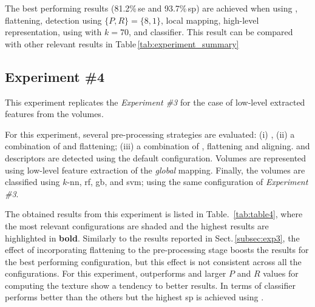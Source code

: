 The best performing results (81.2\%\,\ac{se} and 93.7\%\,\ac{sp}) are achieved when using \nlm, flattening, \lbp detection using $\{P,R\} = \{8,1\}$, local mapping, high-level representation, using \bow with $k=70$, and \svm classifier.
This result can be compared with other relevant results in Table\,\ref{tab:experiment_summary}

\subsection{Experiment \#4}\label{subsec:exp4}
%
%
%
%

This experiment replicates the \emph{Experiment \#3} for the case of low-level extracted features from the volumes.

For this experiment, several pre-processing strategies are evaluated: (i) \nlm, (ii) a combination of \nlm and flattening; (iii) a combination of \nlm, flattening and aligning.
\lbp and \lbptop descriptors are detected using the default configuration.
Volumes are represented using low-level feature extraction of the \emph{global} mapping.
Finally, the volumes are classified using $k$-\ac{nn}, \ac{rf}, \ac{gb}, and \ac{svm}; using the same configuration of \emph{Experiment \#3}.

The obtained results from this experiment is listed in Table.~\ref{tab:table4}, where the most relevant configurations are shaded and the highest results are highlighted in \textbf{bold}.
Similarly to the results reported in Sect.\,\ref{subsec:exp3}, the effect of incorporating flattening to the pre-processing stage boosts the results for the best performing configuration, but this effect is not consistent across all the configurations.
For this experiment, \lbptop outperforms \lbp and larger $P$ and $R$ values for computing the texture show a tendency to better results. 
In terms of classifier \rf performs better than the others but the highest \ac{sp} is achieved using \svm.



